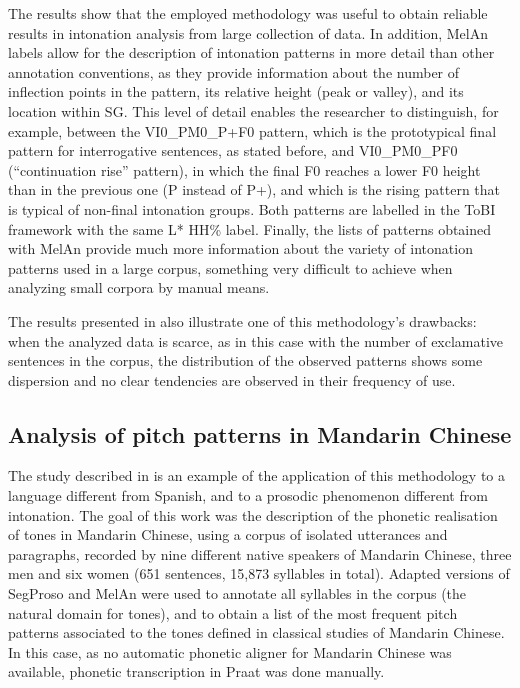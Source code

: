 \documentclass[output=paper]{langsci/langscibook}
\begin{document}
The results show that the employed methodology was useful to obtain reliable results in intonation analysis from large collection of data. In addition, MelAn labels allow for the description of intonation patterns in more detail than other annotation conventions, as they provide information about the number of inflection points in the pattern, its relative height (peak or valley), and its location within SG. This level of detail enables the researcher to distinguish, for example, between the VI0\_PM0\_P+F0 pattern, which is the prototypical final pattern for interrogative sentences, as stated before, and VI0\_PM0\_PF0 (``continuation rise'' pattern), in which the final F0 reaches a lower F0 height than in the previous one (P instead of P+), and which is the rising pattern that is typical of non-final intonation groups. Both patterns are labelled in the ToBI framework with the same L* HH\% label. Finally, the lists of patterns obtained with MelAn provide much more information about the variety of intonation patterns used in a large corpus, something very difficult to achieve when analyzing small corpora by manual means.

The results presented in  also illustrate one of this methodology’s drawbacks: when the analyzed data is scarce, as in this case with the number of exclamative sentences in the corpus, the distribution of the observed patterns shows some dispersion and no clear tendencies are observed in their frequency of use.

\subsection{Analysis of pitch patterns in Mandarin Chinese}\largerpage[2.5]

The study described in \citet{Yao2015} is an example of the application of this methodology to a language different from Spanish, and to a prosodic phenomenon different from intonation. The goal of this work was the description of the phonetic realisation of tones in Mandarin Chinese, using a corpus of isolated utterances and paragraphs, recorded by nine different native speakers of Mandarin Chinese, three men and six women (651 sentences, 15,873 syllables in total). Adapted versions of SegProso and MelAn were used to annotate all syllables in the corpus (the natural domain for tones), and to obtain a list of the most frequent pitch patterns associated to the tones defined in classical studies of Mandarin Chinese. In this case, as no automatic phonetic aligner for Mandarin Chinese was available, phonetic transcription in Praat was done manually.
\end{document}
